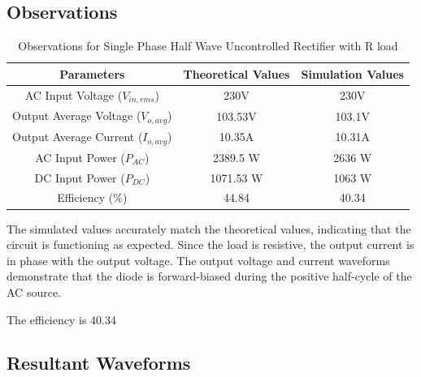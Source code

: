 \subsection{Observations}

\begin{table}[h]
    \renewcommand{\arraystretch}{1.3}
    \label{table_observation_circuit_1}
    \centering
    \begin{tabular}{|c|c|c|}
        \hline
        Parameters                              & Theoretical Values & Simulation Values \\
        \hline
        \hline
        AC Input Voltage ($ V_{in,rms} $)       & 230V               & 230V              \\
        \hline
        Output Average Voltage ($ V_{o,avg} $)  & 103.53V            & 103.1V            \\
        \hline
        Output Average Current ($ I_{o,avg}  $) & 10.35A             & 10.31A            \\
        \hline
        AC Input Power ($ P_{AC}  $)            & 2389.5 W           & 2636 W            \\
        \hline
        DC Input Power ($ P_{DC}  $)            & 1071.53 W          & 1063 W            \\
        \hline
        Efficiency (\%)                         & 44.84              & 40.34             \\
        \hline
    \end{tabular}
    \caption{Observations for Single Phase Half Wave Uncontrolled Rectifier with R load}

\end{table}


The simulated values accurately match the theoretical values, indicating that the circuit is functioning as expected. Since the load is resistive, the output current is in phase with the output voltage. The output voltage and current waveforms demonstrate that the diode is forward-biased during the positive half-cycle of the AC source.

The efficiency is 40.34
\pagebreak

\subsection{Resultant Waveforms}

